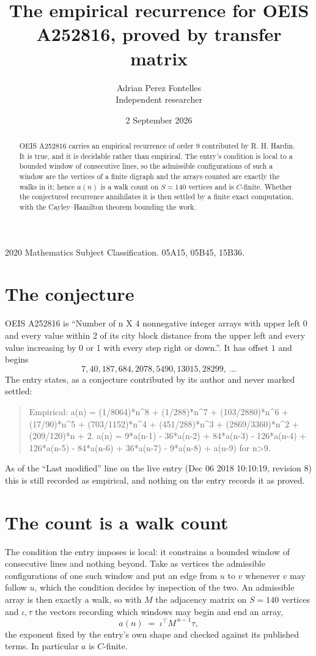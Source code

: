 \documentclass[11pt,a4paper]{article}
\title{The empirical recurrence for OEIS A252816, proved by transfer matrix}
\author{Adrian Perez Fontelles\\ \small Independent researcher}
\date{2 September 2026}
\theoremstyle{plain}
\theoremstyle{definition}
\begin{document}
\maketitle

\begin{abstract}
OEIS A252816 carries an empirical recurrence of order $9$ contributed by R. H. Hardin. It is
true, and it is decidable rather than empirical. The entry's condition is local to a bounded window of consecutive lines, so
the admissible configurations of such a window are the vertices of a finite digraph and the
arrays counted are exactly the walks in it; hence $a(n)$ is a walk count on $S=140$ vertices
and is $C$-finite. Whether the conjectured recurrence annihilates it is then settled by a
finite exact computation, with the Cayley--Hamilton theorem bounding the work.
\end{abstract}

\noindent\small 2020 Mathematics Subject Classification. 05A15, 05B45, 15B36.\normalsize

\section{The conjecture}

OEIS A252816 is ``Number of n X 4 nonnegative integer arrays with upper left 0 and every value within 2 of its city block distance from the upper left and every value increasing by 0 or 1 with every step right or down.''. It has offset $1$ and begins
\[
7, 40, 187, 684, 2078, 5490, 13015, 28299,\ \dots
\]
The entry states, as a conjecture contributed by its author and never marked settled:
\begin{quote}
Empirical: a(n) = (1/8064)*n\^{}8 + (1/288)*n\^{}7 + (103/2880)*n\^{}6 + (17/90)*n\^{}5 + (703/1152)*n\^{}4 + (451/288)*n\^{}3 + (2869/3360)*n\^{}2 + (209/120)*n + 2. a(n) = 9*a(n-1) - 36*a(n-2) + 84*a(n-3) - 126*a(n-4) + 126*a(n-5) - 84*a(n-6) + 36*a(n-7) - 9*a(n-8) + a(n-9) for n>9.
\end{quote}
As of the ``Last modified'' line on the live entry (Dec 06 2018 10:10:19, revision 8) this is still
recorded as empirical, and nothing on the entry records it as proved.

\section{The count is a walk count}

The condition the entry imposes is local: it constrains a bounded window of consecutive lines and nothing beyond. Take as
vertices the admissible configurations of one such window and put an edge from $u$ to $v$
whenever $v$ may follow $u$, which the condition decides by inspection of the two. An
admissible array is then exactly a walk, so with $M$ the adjacency matrix on $S=140$ vertices
and $\iota,\tau$ the vectors recording which windows may begin and end an array,
\[
a(n)\;=\;\iota^{\!\top}M^{\,n-1}\tau ,
\]
the exponent fixed by the entry's own shape and checked against its published terms. In
particular $a$ is $C$-finite.
\end{document}
